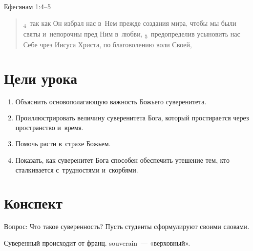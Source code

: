 \documentclass[a4paper,12pt]{article}
\begin{document}
\noindent
Ефесянам 1:4–5

\begin{quote}
\textsubscript{4}~так как Он избрал нас в~Нем прежде создания мира, чтобы мы были святы и~непорочны пред Ним в~любви,
\textsubscript{5}~предопределив усыновить нас Себе чрез Иисуса Христа, по благоволению воли Своей,
\end{quote}

\section*{Цели урока}
\begin{enumerate}
    \item Объяснить основополагающую важность Божьего суверенитета.
    \item Проиллюстрировать величину суверенитета Бога, который простирается через пространство и~время.
    \item Помочь расти в~страхе Божьем.
    \item Показать, как суверенитет Бога способен обеспечить утешение тем, кто сталкивается с~трудностями и~скорбями. 
\end{enumerate}

\section*{Конспект}

Вопрос: Что такое суверенность? Пусть студенты сформулируют своими словами.

Суверенный происходит от франц. souverain~--- «верховный».
\end{document}
